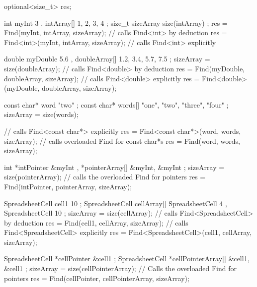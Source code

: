 \begin{cpp}
optional<size_t> res;

int myInt { 3 }, intArray[] { 1, 2, 3, 4 };
size_t sizeArray { size(intArray) };
res = Find(myInt, intArray, sizeArray); // calls Find<int> by deduction
res = Find<int>(myInt, intArray, sizeArray); // calls Find<int> explicitly

double myDouble { 5.6 }, doubleArray[] { 1.2, 3.4, 5.7, 7.5 };
sizeArray = size(doubleArray);
// calls Find<double> by deduction
res = Find(myDouble, doubleArray, sizeArray);
// calls Find<double> explicitly
res = Find<double>(myDouble, doubleArray, sizeArray);

const char* word { "two" };
const char* words[] { "one", "two", "three", "four" };
sizeArray = size(words);

// calls Find<const char*> explicitly
res = Find<const char*>(word, words, sizeArray);
// calls overloaded Find for const char*s
res = Find(word, words, sizeArray);

int *intPointer { &myInt }, *pointerArray[] { &myInt, &myInt };
sizeArray = size(pointerArray);
// calls the overloaded Find for pointers
res = Find(intPointer, pointerArray, sizeArray);

SpreadsheetCell cell1 { 10 };
SpreadsheetCell cellArray[] { SpreadsheetCell { 4 }, SpreadsheetCell { 10 } };
sizeArray = size(cellArray);
// calls Find<SpreadsheetCell> by deduction
res = Find(cell1, cellArray, sizeArray);
// calls Find<SpreadsheetCell> explicitly
res = Find<SpreadsheetCell>(cell1, cellArray, sizeArray);

SpreadsheetCell *cellPointer { &cell1 };
SpreadsheetCell *cellPointerArray[] { &cell1, &cell1 };
sizeArray = size(cellPointerArray);
// Calls the overloaded Find for pointers
res = Find(cellPointer, cellPointerArray, sizeArray);
\end{cpp}

































